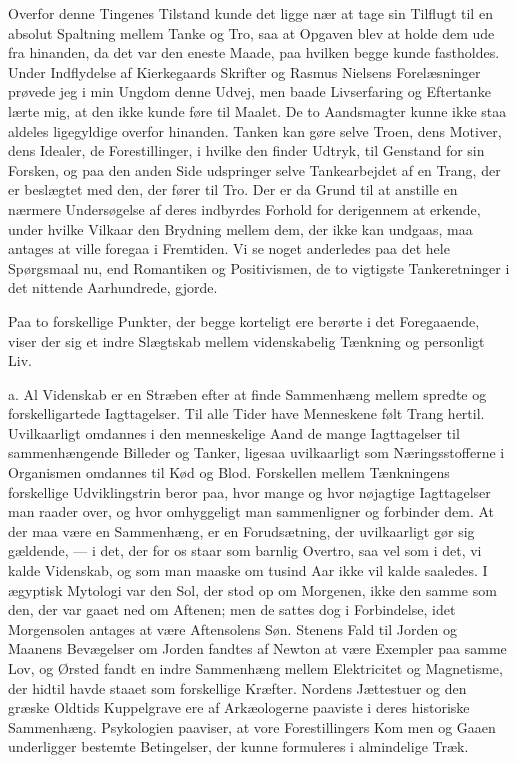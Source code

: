 \documentclass[12pt,a4paper]{article}
\newcommand{\opage}[1]{\marginnote{\footnotesize\textit{[#1]}}}
\begin{document}
Overfor denne Tingenes Tilstand kunde det ligge nær at tage sin Tilflugt til
en absolut Spaltning mellem Tanke og Tro, saa at Opgaven blev at holde dem
ude fra hinanden, da det var den eneste Maade, paa hvilken begge kunde
fastholdes. Under Indflydelse af Kierkegaards Skrifter og Rasmus Nielsens
Forelæsninger prøvede jeg i min Ungdom denne Udvej, men baade Livserfaring og
Eftertanke lærte mig, at den ikke kunde føre til Maalet. De to Aandsmagter
kunne ikke staa aldeles ligegyldige overfor hinanden. Tanken kan gøre selve
Troen, dens Motiver, dens Idealer, de Forestillinger, i hvilke den finder
Udtryk, til Genstand for sin Forsken, og paa den anden Side udspringer selve
Tankearbejdet af en Trang, der er beslægtet med den, der fører til Tro. Der
er da \opage{39} Grund til at anstille en nærmere Undersøgelse af deres indbyrdes
Forhold for derigennem at erkende, under hvilke Vilkaar den Brydning mellem
dem, der ikke kan undgaas, maa antages at ville foregaa i Fremtiden. Vi se
noget anderledes paa det hele Spørgsmaal nu, end Romantiken og Positivismen,
de to vigtigste Tankeretninger i det nittende Aarhundrede, gjorde.

\medskip

Paa to forskellige Punkter, der begge korteligt ere berørte i det
Foregaaende, viser der sig et indre Slægtskab mellem videnskabelig Tænkning
og personligt Liv.

a. Al Videnskab er en Stræben efter at finde Sammenhæng mellem spredte og
forskelligartede Iagttagelser. Til alle Tider have Menneskene følt Trang
hertil. Uvilkaarligt omdannes i den menneskelige Aand de mange Iagttagelser
til sammenhængende Billeder og Tanker, ligesaa uvilkaarligt som
Næringsstofferne i Organismen omdannes til Kød og Blod. Forskellen mellem
Tænkningens forskellige Udviklingstrin beror paa, hvor mange og hvor nøjagtige
Iagttagelser man raader over, og hvor omhyggeligt man sammenligner og
forbinder dem. At der maa være en Sammenhæng, er en Forudsætning, der
uvilkaarligt gør sig gældende, --- i det, der for os staar som barnlig
Overtro, saa vel som i det, vi kalde Videnskab, og som man maaske om tusind
Aar ikke vil kalde saaledes. I ægyptisk Mytologi var den Sol, der stod op om
Morgenen, ikke den samme som den, der var gaaet ned om Aftenen; men de sattes
dog i Forbindelse, idet Morgensolen antages at være Aftensolens Søn. Stenens
Fald til Jorden og Maanens Bevægelser om Jorden fandtes af Newton at være
Exempler paa samme Lov, og Ørsted fandt en indre Sammenhæng mellem
Elektricitet og Magnetisme, der hidtil havde staaet som forskellige Kræfter.
Nordens Jættestuer og den græske Oldtids Kuppelgrave ere af Arkæologerne
paaviste i deres historiske Sammenhæng. Psykologien paaviser, at vore
Forestillingers Kom%
\opage{40}men og Gaaen underligger bestemte Betingelser, der kunne
formuleres i almindelige Træk.
\end{document}
